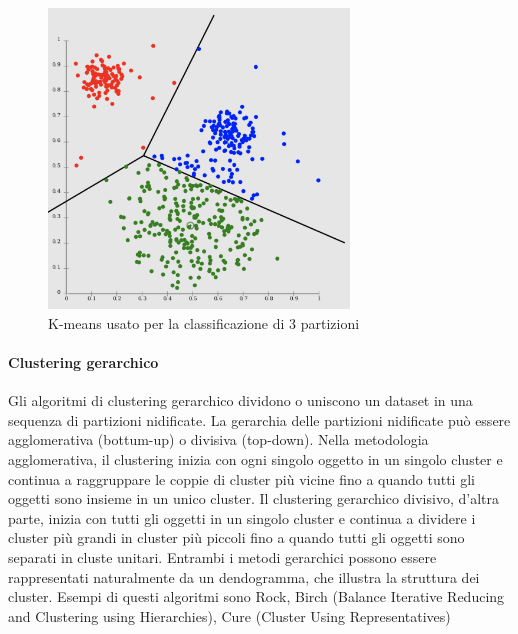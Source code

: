 \documentclass[12pt, a4paper, italian]{report}
\numberwithin{figure}{chapter}
\numberwithin{table}{chapter}
\begin{document}
\begin{figure}[h] \centering
\includegraphics[width=8cm]{C_Partizionale.png}
\caption{K-means usato per la classificazione di 3 partizioni\protect\footnotemark}
\label{fig:esempio k-means}
\end{figure}

\paragraph{Clustering gerarchico} 
Gli algoritmi di clustering gerarchico dividono o uniscono un dataset in una sequenza di partizioni nidificate. La gerarchia delle partizioni nidificate può essere agglomerativa (bottum-up) o divisiva (top-down). Nella metodologia agglomerativa, il clustering inizia con ogni singolo oggetto in un singolo cluster e continua a raggruppare le coppie di cluster più vicine fino a quando tutti gli oggetti sono insieme in un unico cluster. Il clustering gerarchico divisivo, d'altra parte, inizia con tutti gli oggetti in un singolo cluster e continua a dividere i cluster più grandi in cluster più piccoli fino a quando tutti gli oggetti sono separati in cluste unitari. Entrambi i metodi gerarchici possono essere rappresentati naturalmente da un dendogramma, che illustra la struttura dei cluster. Esempi di questi algoritmi sono Rock, Birch (Balance Iterative Reducing and Clustering using Hierarchies), Cure (Cluster Using Representatives)
\end{document}
